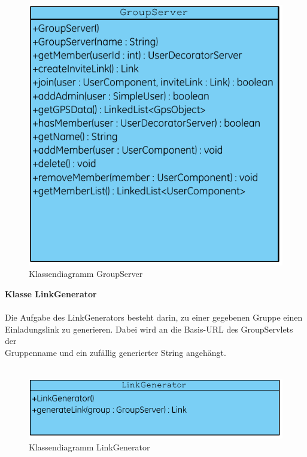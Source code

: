 \begin{figure}[h]
     \centering
     \includegraphics[scale=1.0, trim=2 2 2 2, clip=true]{servergraphs/group-server.pdf}
     \caption{Klassendiagramm GroupServer}
\end{figure}
\clearpage

\textbf{Klasse LinkGenerator}\\
\\
Die Aufgabe des LinkGenerators besteht darin, zu einer gegebenen Gruppe einen \\
Einladungslink zu generieren. Dabei wird an die Basis-URL des GroupServlets der\\
Gruppenname und ein zufällig generierter String angehängt.\\ \\


\begin{figure}[h]
     \centering
     \includegraphics[scale=1.0, trim=2 2 2 2, clip=true]{servergraphs/link-generator.pdf}
     \caption{Klassendiagramm LinkGenerator}
\end{figure}
\clearpage

